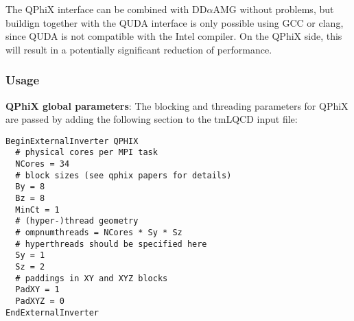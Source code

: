 The QPhiX interface can be combined with DD$\alpha$AMG without problems, but buildign together with the QUDA interface is only possible using GCC or clang, since QUDA is not compatible with the Intel compiler.
On the QPhiX side, this will result in a potentially significant reduction of performance.

\subsubsection{Usage}

\noindent\textbf{QPhiX global parameters}: The blocking and threading parameters for QPhiX are passed by adding the following section to the tmLQCD input file:
\begin{framed}
\begin{Verbatim}
BeginExternalInverter QPHIX
  # physical cores per MPI task
  NCores = 34
  # block sizes (see qphix papers for details)
  By = 8
  Bz = 8
  MinCt = 1
  # (hyper-)thread geometry
  # ompnumthreads = NCores * Sy * Sz
  # hyperthreads should be specified here
  Sy = 1
  Sz = 2
  # paddings in XY and XYZ blocks
  PadXY = 1
  PadXYZ = 0
EndExternalInverter    
\end{Verbatim}
\end{framed}

